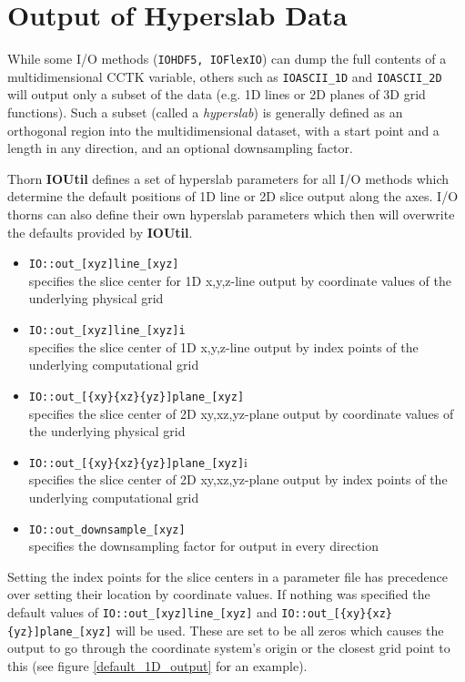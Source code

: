 \documentclass{article}
\begin{document}
\section{Output of Hyperslab Data}

While some I/O methods ({\tt IOHDF5, IOFlexIO}) can dump the full
contents of a multidimensional CCTK variable, others such as {\tt IOASCII\_1D}
and {\tt IOASCII\_2D} will output only a subset of the data (e.g. 1D lines or 2D
planes of 3D grid functions).
Such a subset (called a {\it hyperslab}) is generally defined as an orthogonal
region into the multidimensional dataset, with a start point and a length in any
direction, and an optional downsampling factor.

Thorn {\bf IOUtil} defines a set of hyperslab parameters for all
I/O methods which determine the default positions of 1D line or 2D slice output
along the axes. I/O thorns can also define their own hyperslab parameters
which then will overwrite the defaults provided by {\bf IOUtil}.

\begin{itemize}
  \item {\tt IO::out\_[xyz]line\_[xyz]}\\
    specifies the slice center for 1D x,y,z-line output by coordinate values
    of the underlying physical grid
  \item {\tt IO::out\_[xyz]line\_[xyz]i}\\
    specifies the slice center of 1D x,y,z-line output by index points
    of the underlying computational grid
  \item {\tt IO::out\_[\{xy\}\{xz\}\{yz\}]plane\_[xyz]}\\
    specifies the slice center of 2D xy,xz,yz-plane output by coordinate values
    of the underlying physical grid
  \item {\tt IO::out\_[\{xy\}\{xz\}\{yz\}]plane\_[xyz]}i\\
    specifies the slice center of 2D xy,xz,yz-plane output by index points
    of the underlying computational grid
  \item {\tt IO::out\_downsample\_[xyz]}\\
    specifies the downsampling factor for output in every direction
\end{itemize}

Setting the index points for the slice centers in a parameter file has
precedence over setting their location by coordinate values.
If nothing was specified the default values of {\tt IO::out\_[xyz]line\_[xyz]}
and {\tt IO::out\_[\{xy\}\{xz\}\{yz\}]plane\_[xyz]} will be used.
These are set to be all zeros which causes the output to go through the
coordinate system's origin or the closest grid point to this (see figure
\ref{default_1D_output} for an example).
\end{document}
